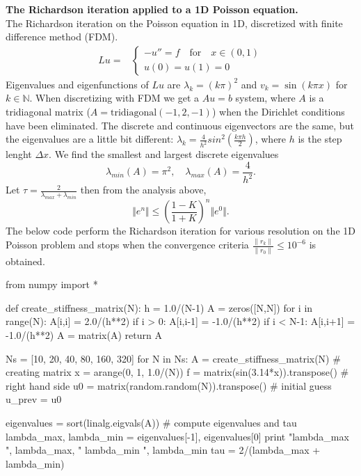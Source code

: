 \begin{example}{\textbf{The Richardson iteration applied to a  1D Poisson equation.}}\label{ex:1D_poisson}\\ %
The Richardson iteration on the Poisson equation in 1D, discretized with finite difference method (FDM).
\begin{align}
Lu =&\left\{ \begin{array}{lr}  -u'' = f \quad \text{for} \quad x \in (0,1)\\ 
u(0) = u(1) = 0  \end{array} \right.
\end{align}
Eigenvalues and eigenfunctions of $Lu$ are $\lambda_k = (k\pi)^2$ and $v_k = \sin(k\pi x) $ 
for $k \in \mathbb{N}$. 
When discretizing with FDM we get a $Au = b$ system, where $A$ is a tridiagonal matrix
($A = \text{tridiagonal}(-1,2,-1)$) when the Dirichlet conditions have
been eliminated. The discrete and continuous eigenvectors are the same, but the eigenvalues are a little 
bit different: $\lambda_{k} = \frac{4}{h^2}sin^2(\frac{k\pi h}{2})$, where $h$ is the step 
lenght $\Delta x$. We find the smallest and largest discrete eigenvalues
\[
\lambda_{min}(A) = \pi^2, \quad \lambda_{max}(A) = \frac{4}{h^2}. 
\]
Let $\tau = \frac{2}{\lambda_{max} + \lambda_{min}}$ then from the analysis above,
\[
\Vert e^n\Vert \leqslant (\frac{1-K}{1+K})^{n}\Vert e^0 \Vert.
\]
The below code perform the Richardson iteration for various 
resolution on the 1D Poisson problem and stops when 
the convergence criteria $\frac{\|r_k\|}{\|r_0\|} \le 10^{-6}$ 
is obtained. 
\begin{python}
from numpy import * 

def create_stiffness_matrix(N): 
  h = 1.0/(N-1)
  A = zeros([N,N])
  for i in range(N): 
    A[i,i] = 2.0/(h**2) 
    if i > 0: 
      A[i,i-1] = -1.0/(h**2) 
    if i < N-1: 
      A[i,i+1] = -1.0/(h**2) 
  A = matrix(A)
  return A 

Ns = [10, 20, 40, 80, 160, 320] 
for N in Ns: 
  A = create_stiffness_matrix(N)              # creating matrix
  x = arange(0, 1, 1.0/(N))
  f = matrix(sin(3.14*x)).transpose()         # right hand side
  u0 = matrix(random.random(N)).transpose()   # initial guess 
  u_prev = u0 

  eigenvalues = sort(linalg.eigvals(A))       # compute eigenvalues and tau 
  lambda_max, lambda_min = eigenvalues[-1],  eigenvalues[0]
  print "lambda_max ", lambda_max, " lambda_min ", lambda_min
  tau = 2/(lambda_max + lambda_min)


\end{python}
\end{example}
